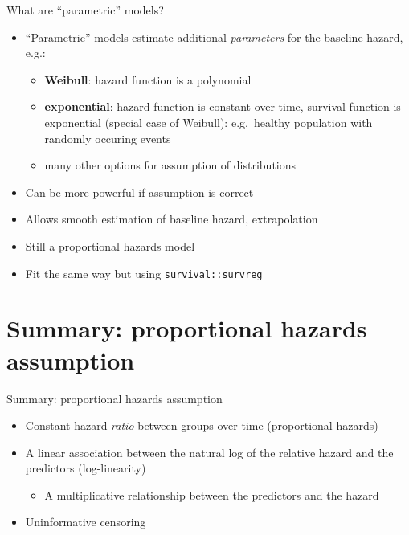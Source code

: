 \documentclass[
  ignorenonframetext,
]{beamer}
\providecommand{\tightlist}{%
  \setlength{\itemsep}{0pt}\setlength{\parskip}{0pt}}
\begin{document}
\begin{frame}[fragile]{What are ``parametric'' models?}
\protect\hypertarget{what-are-parametric-models}{}

\begin{itemize}
\tightlist
\item
  ``Parametric'' models estimate additional \emph{parameters} for the
  baseline hazard, e.g.:

  \begin{itemize}
  \tightlist
  \item
    \textbf{Weibull}: hazard function is a polynomial
  \item
    \textbf{exponential}: hazard function is constant over time,
    survival function is exponential (special case of Weibull):
    e.g.~healthy population with randomly occuring events
  \item
    many other options for assumption of distributions
  \end{itemize}
\item
  Can be more powerful if assumption is correct
\item
  Allows smooth estimation of baseline hazard, extrapolation
\item
  Still a proportional hazards model
\item
  Fit the same way but using \texttt{survival::survreg}
\end{itemize}

\end{frame}

\hypertarget{summary-proportional-hazards-assumption}{%
\section{Summary: proportional hazards
assumption}\label{summary-proportional-hazards-assumption}}

\begin{frame}{Summary: proportional hazards assumption}

\begin{itemize}
\tightlist
\item
  Constant hazard \emph{ratio} between groups over time (proportional
  hazards)
\item
  A linear association between the natural log of the relative hazard
  and the predictors (log-linearity)

  \begin{itemize}
  \tightlist
  \item
    A multiplicative relationship between the predictors and the hazard
  \end{itemize}
\item
  Uninformative censoring
\end{itemize}

\end{frame}
\end{document}
